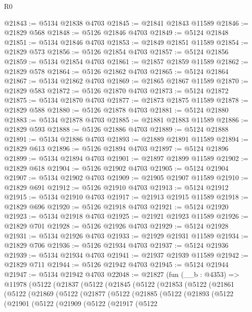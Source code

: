 \begin{lexlean}{R0}
\begin{coremodule}
@21843 := @5134 @21838 @4703
@21845 := @21841 @21843 @11589
@21846 := @21829 @568
@21848 := @5126 @21846 @4703
@21849 := @5124 @21848
@21851 := @5134 @21846 @4703
@21853 := @21849 @21851 @11589
@21854 := @21829 @573
@21856 := @5126 @21854 @4703
@21857 := @5124 @21856
@21859 := @5134 @21854 @4703
@21861 := @21857 @21859 @11589
@21862 := @21829 @578
@21864 := @5126 @21862 @4703
@21865 := @5124 @21864
@21867 := @5134 @21862 @4703
@21869 := @21865 @21867 @11589
@21870 := @21829 @583
@21872 := @5126 @21870 @4703
@21873 := @5124 @21872
@21875 := @5134 @21870 @4703
@21877 := @21873 @21875 @11589
@21878 := @21829 @588
@21880 := @5126 @21878 @4703
@21881 := @5124 @21880
@21883 := @5134 @21878 @4703
@21885 := @21881 @21883 @11589
@21886 := @21829 @593
@21888 := @5126 @21886 @4703
@21889 := @5124 @21888
@21891 := @5134 @21886 @4703
@21893 := @21889 @21891 @11589
@21894 := @21829 @613
@21896 := @5126 @21894 @4703
@21897 := @5124 @21896
@21899 := @5134 @21894 @4703
@21901 := @21897 @21899 @11589
@21902 := @21829 @618
@21904 := @5126 @21902 @4703
@21905 := @5124 @21904
@21907 := @5134 @21902 @4703
@21909 := @21905 @21907 @11589
@21910 := @21829 @691
@21912 := @5126 @21910 @4703
@21913 := @5124 @21912
@21915 := @5134 @21910 @4703
@21917 := @21913 @21915 @11589
@21918 := @21829 @696
@21920 := @5126 @21918 @4703
@21921 := @5124 @21920
@21923 := @5134 @21918 @4703
@21925 := @21921 @21923 @11589
@21926 := @21829 @701
@21928 := @5126 @21926 @4703
@21929 := @5124 @21928
@21931 := @5134 @21926 @4703
@21933 := @21929 @21931 @11589
@21934 := @21829 @706
@21936 := @5126 @21934 @4703
@21937 := @5124 @21936
@21939 := @5134 @21934 @4703
@21941 := @21937 @21939 @11589
@21942 := @21829 @711
@21944 := @5126 @21942 @4703
@21945 := @5124 @21944
@21947 := @5134 @21942 @4703
@22048 := @21827
    (fun (__b : @4353) =>
    @11978
      (@5122
        (@21837
          (@5122
            (@21845
              (@5122
                (@21853
                  (@5122
                    (@21861
                      (@5122
                        (@21869
                          (@5122
                            (@21877
                              (@5122
                                (@21885
                                  (@5122
                                    (@21893
                                      (@5122
                                        (@21901
                                          (@5122
                                            (@21909
                                              (@5122
                                                (@21917
                                                  (@5122

\end{coremodule}
\end{lexlean}
